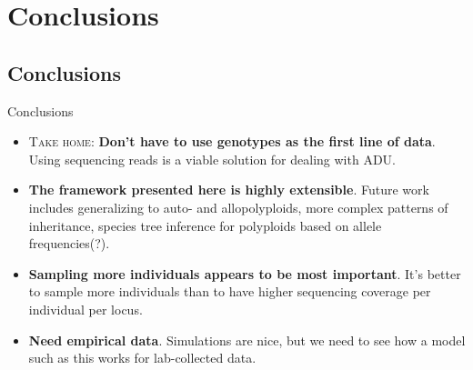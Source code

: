 \documentclass[presentation]{beamer}
\begin{document}
\section{Conclusions}

\subsection*{Conclusions}

\begin{frame}[t]{Conclusions}
	\fontsize{10pt}{10}\selectfont
	\begin{itemize}
		\item \textsc{Take home}: \textbf{Don't have to use genotypes as the first line of data}. Using sequencing reads is a viable solution for dealing with ADU.
		\vspace{0.2in}
	
		\item \textbf{The framework presented here is highly extensible}. Future work includes generalizing to auto- and allopolyploids, more complex patterns of inheritance, species tree inference for polyploids based on allele frequencies(?).
		\vspace{0.2in}
		
		\item \textbf{Sampling more individuals appears to be most important}. It's better to sample more individuals than to have higher sequencing coverage per individual per locus.
		\vspace{0.2in}
		
		\item \textbf{Need empirical data}. Simulations are nice, but we need to see how a model such as this works for lab-collected data.
		
	\end{itemize}
	
\end{frame}

\section*{}
\end{document}
